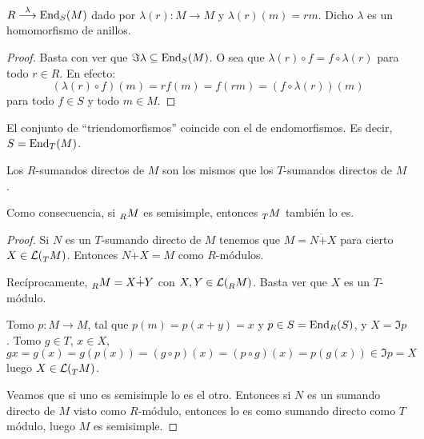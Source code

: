 \begin{lema}
  \(R\overset{\lambda}{\longrightarrow} \operatorname{End}_S(M)\) dado por
  \(\lambda(r):M\longrightarrow M\) y \(\lambda(r)(m)=rm\).
  Dicho \(\lambda\) es un homomorfismo de anillos.
\end{lema}
\begin{proof}
  Basta con ver que \(\Im\lambda\subseteq\operatorname{End}_S(M)\). O sea que
  \(\lambda(r)\circ f=f\circ\lambda(r)\) para todo \(r\in R\).
  En efecto:
  \[
    (\lambda(r)\circ f)(m)=rf(m)=f(rm)=(f\circ\lambda(r))(m)
  \]
  para todo \(f\in S\) y todo \(m \in M\).
\end{proof}
\begin{obs}
  El conjunto de ``triendomorfismos'' coincide con el de endomorfismos.
  Es decir, \(S=\operatorname{End}_T(M)\).
\end{obs}
\begin{prop}
  Los \(R\)-sumandos directos de \(M\) son los mismos que los \(T\)-sumandos
  directos de \(M\).

  Como consecuencia, si \(\prescript{}{R}{M}\) es semisimple, entonces
  \(\prescript{}{T}{M}\) también lo es.
\end{prop}
\begin{proof}
  Si \(N\) es un \(T\)-sumando directo de \(M\) tenemos que
  \(M=N\dot{+}X\) para cierto \(X\in\mathcal{L}(\prescript{}{T}{M})\).
  Entonces \(N\dot{+}X=M\) como \(R\)-módulos.

  Recíprocamente, \(\prescript{}{R}{M}=X\dot{+}Y\) con \(X,Y\in\mathcal{L}
  (\prescript{}{R}{M})\). Basta ver que \(X\) es un \(T\)-módulo.

  Tomo \(p:M\longrightarrow M\), tal que \(p(m)=p(x+y)=x\) y
  \(p\in S=\operatorname{End}_R(S)\), y \(X=\Im p\). Tomo \(g\in T\), \(x\in X\),
  \[g x=g(x)=g(p(x))=(g\circ p)(x)=(p\circ g)(x)=p(g(x))\in \Im p=X\]
  luego \(X\in\mathcal{L}(\prescript{}{T}{M})\).

  Veamos que si uno es semisimple lo es el otro.
  Entonces si \(N\)  es un sumando directo de \(M\)
  visto como \(R\)-módulo, entonces
  lo es como sumando directo como \(T\) módulo, luego \(M\) es semisimple.

\end{proof}


